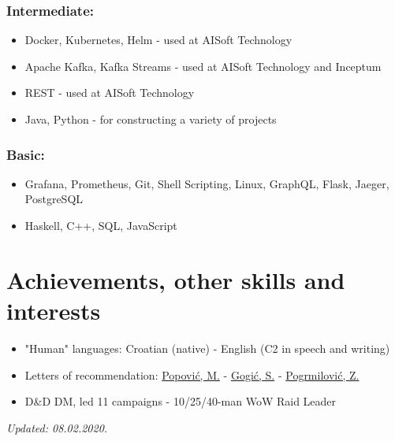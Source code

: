 \documentclass[a4paper]{article}
\newcommand{\bolditalicpair}
[2]
{\textbf{#1} \texorpdfstring{\hfill}{} \textit{#2}}
\begin{document}
\subsubsection{\bolditalicpair{Intermediate:}{}}

\begin{itemize}
  \item Docker, Kubernetes, Helm - used at AISoft Technology
  \item Apache Kafka, Kafka Streams - used at AISoft Technology and Inceptum
  \item REST - used at AISoft Technology
  \item Java, Python - for constructing a variety of projects
\end{itemize}

\subsubsection{\bolditalicpair{Basic:}{}}

\begin{itemize}
  \item Grafana, Prometheus, Git, Shell Scripting, Linux, GraphQL, Flask, Jaeger, PostgreSQL
  \item Haskell, C++, SQL, JavaScript
\end{itemize}



\section{Achievements, other skills and interests}

\begin{itemize}
  \item "Human" languages: Croatian (native) - English (C2 in speech and writing)
  \item Letters of recommendation: \href{https://github.com/MislavJaksic/CV/blob/master/LoR/AISoft_Popovic.pdf}{Popović, M.} - \href{https://github.com/MislavJaksic/CV/blob/master/LoR/Atos_Gogic.pdf}{Gogić, S.} - \href{https://github.com/MislavJaksic/CV/blob/master/LoR/Atos_Pogrmilovic.pdf}{Pogrmilović, Z.}
  \item D\&D DM, led 11 campaigns - 10/25/40-man WoW Raid Leader
\end{itemize}

\bolditalicpair{}{Updated: 08.02.2020.}
\end{document}
